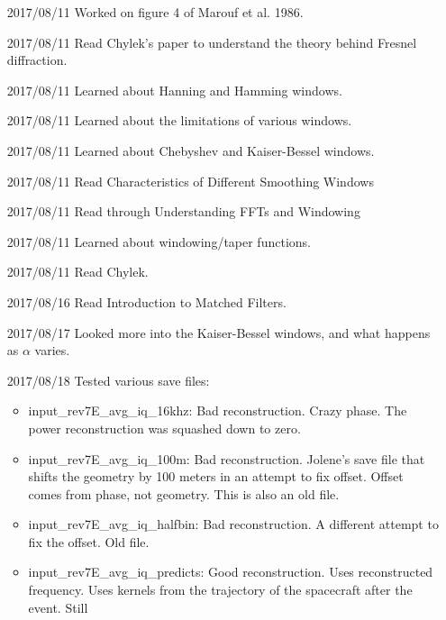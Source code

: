 \documentclass[crop=false,class=article,oneside]{standalone}
\begin{document}
\begin{enumerate}[leftmargin=55pt]
            \item[2017/08/11] Worked on figure 4 of Marouf et al. 1986.
            \item[2017/08/11] Read Chylek's paper to understand the
                              theory behind Fresnel diffraction.
            \item[2017/08/11] Learned about Hanning and Hamming windows.
            \item[2017/08/11] Learned about the limitations
                              of various windows.
            \item[2017/08/11] Learned about Chebyshev and
                              Kaiser-Bessel windows.
            \item[2017/08/11] Read Characteristics of
                              Different Smoothing Windows
            \item[2017/08/11] Read through Understanding FFTs
                              and Windowing
            \item[2017/08/11] Learned about windowing/taper functions.
            \item[2017/08/11] Read Chylek.
            \item[2017/08/16] Read Introduction to Matched Filters.
            \item[2017/08/17] Looked more into the Kaiser-Bessel windows,
                              and what happens as $\alpha$ varies.
            \item[2017/08/18] Tested various save files:
            \begin{itemize}
                \item input\_rev7E\_avg\_iq\_16khz: Bad reconstruction.
                      Crazy phase. The power reconstruction was squashed
                      down to zero.
                \item input\_rev7E\_avg\_iq\_100m: Bad reconstruction.
                      Jolene's save file that shifts the geometry by 100
                      meters in an attempt to fix offset. Offset comes
                      from phase, not geometry. This is also an old file.
                \item input\_rev7E\_avg\_iq\_halfbin: Bad reconstruction.
                      A different attempt to fix the offset. Old file.
                \item input\_rev7E\_avg\_iq\_predicts: Good reconstruction.
                      Uses reconstructed frequency. Uses kernels from the
                      trajectory of the spacecraft after the event. Still

\end{itemize}
\end{enumerate}
\end{document}
